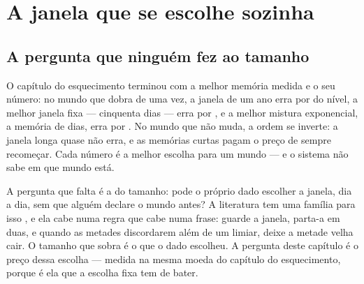 
\chapter{A janela que se escolhe sozinha}\label{cap:escolhe}

\section{A pergunta que ninguém fez ao tamanho}

O capítulo do esquecimento terminou com a melhor memória medida e o seu número: no mundo que dobra
de uma vez, a janela de um ano erra por \numEsquecimentoJanelaDuzentosECinquenta{} do nível, a
melhor janela fixa --- cinquenta dias --- erra por \numEsquecimentoJanelaCinquenta, e a melhor
mistura exponencial, a memória de \numEsquecimentoMelhorMemoria{} dias, erra por
\numEsquecimentoMelhor. No mundo que não muda, a ordem se inverte: a janela longa quase não erra, e
as memórias curtas pagam o preço de sempre recomeçar. Cada número é a melhor escolha para um mundo
--- e o sistema não sabe em que mundo está.

A pergunta que falta é a do tamanho: pode o próprio dado escolher a janela, dia a dia, sem que
alguém declare o mundo antes? A literatura tem uma família para isso
\cite{gavalda2007learning,gama2004learning}, e ela cabe numa regra que cabe numa frase: guarde a janela, parta-a em duas, e
quando as metades discordarem além de um limiar, deixe a metade velha cair. O tamanho que sobra é o
que o dado escolheu. A pergunta deste capítulo é o preço dessa escolha --- medida na mesma moeda do
capítulo do esquecimento, porque é ela que a escolha fixa tem de bater.

